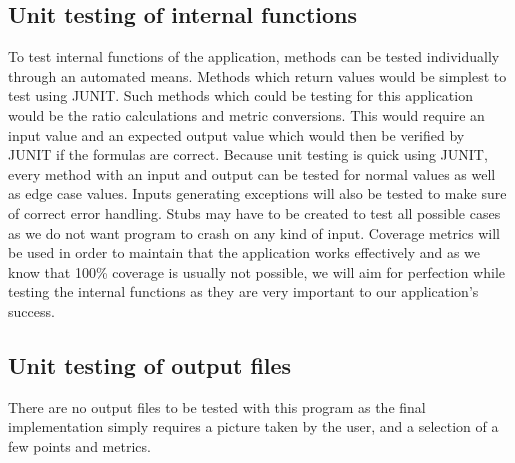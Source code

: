 \documentclass[12pt, titlepage]{article}
\begin{document}
\subsection{Unit testing of internal functions}

To test internal functions of the application, methods can be tested individually through an automated means. Methods which return values would be simplest to test using JUNIT. Such methods which could be testing for this application would be the ratio calculations and metric conversions. This would require an input value and an expected output value which would then be verified by JUNIT if the formulas are correct. Because unit testing is quick using JUNIT, every method with an input and output can be tested for normal values as well as edge case values. Inputs generating exceptions will also be tested to make sure of correct error handling. Stubs may have to be created to test all possible cases as we do not want program to crash on any kind of input. Coverage metrics will be used in order to maintain that the application works effectively and as we know that 100\% coverage is usually not possible, we will aim for perfection while testing the internal functions as they are very important to our application’s success. 
		
\subsection{Unit testing of output files}

There are no output files to be tested with this program as the final implementation simply requires a picture taken by the user, and a selection of a few points and metrics.	



\newpage
\end{document}
